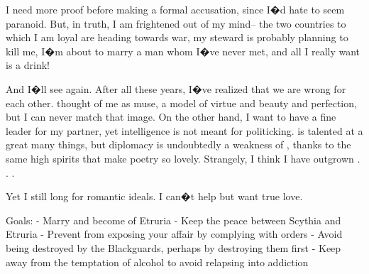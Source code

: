 \documentclass[char]{Kos}
\begin{document}
I need more proof before making a formal accusation, since I�d hate to seem paranoid. But, in truth, I am frightened out of my mind-- the two countries to which I am loyal are heading towards war, my steward is probably planning to kill me, I�m about to marry a man whom I�ve never met, and all I really want is a drink!

And I�ll see \cPoet{\nickname} again. After all these years, I�ve realized that we are wrong for each other. \cPoet{\They} thought of me as \cPoet{\their} muse, a model of virtue and beauty and perfection, but I can never match that image. On the other hand, I want to have a fine leader for my partner, yet \cPoet{\their} intelligence is not meant for politicking. \cPoet{\They} is talented at a great many things, but diplomacy is undoubtedly a weakness of \cPoet{\theirs}, thanks to the same high spirits that make \cPoet{\their} poetry so lovely. Strangely, I think I have outgrown \cPoet{\them} . . .

Yet I still long for \cPoet{\their} romantic ideals. I can�t help but want true love.

Goals:
- Marry \cGroom{\nickname} and become \cBride{\prince} of Etruria
- Keep the peace between Scythia and Etruria
- Prevent \cEtruriaKing{\nickname} from exposing your affair by complying with \cEtruriaKing{\their} orders
- Avoid being destroyed by the Blackguards, perhaps by destroying them first
- Keep away from the temptation of alcohol to avoid relapsing into addiction
\end{document}
